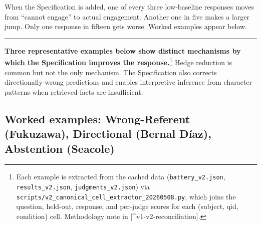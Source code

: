 When the Specification is added, one of every three low-baseline
responses moves from ``cannot engage'' to actual engagement. Another one
in five makes a larger jump. Only one response in fifteen gets worse.
Worked examples appear below.

\begin{center}\rule{0.5\linewidth}{0.5pt}\end{center}

\textbf{Three representative examples below show distinct mechanisms by
which the Specification improves the response.}\footnote{Each example is
  extracted from the cached data (\texttt{battery\_v2.json},
  \texttt{results\_v2.json}, \texttt{judgments\_v2.json}) via
  \texttt{scripts/v2\_canonical\_cell\_extractor\_20260508.py}, which
  joins the question, held-out, response, and per-judge scores for each
  (subject, qid, condition) cell. Methodology note in
  {[}\^{}v1-v2-reconciliation{]}.} Hedge reduction is common but not the
only mechanism. The Specification also corrects directionally-wrong
predictions and enables interpretive inference from character patterns
when retrieved facts are insufficient.

\hypertarget{worked-examples-wrong-referent-fukuzawa-directional-bernal-duxedaz-abstention-seacole}{%
\subsection{Worked examples: Wrong-Referent (Fukuzawa), Directional
(Bernal Díaz), Abstention
(Seacole)}\label{worked-examples-wrong-referent-fukuzawa-directional-bernal-duxedaz-abstention-seacole}}

